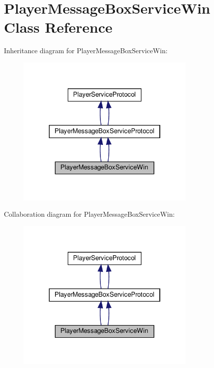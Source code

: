 \hypertarget{classPlayerMessageBoxServiceWin}{}\section{Player\+Message\+Box\+Service\+Win Class Reference}
\label{classPlayerMessageBoxServiceWin}


Inheritance diagram for Player\+Message\+Box\+Service\+Win\+:
\nopagebreak
\begin{figure}[H]
\begin{center}
\leavevmode
\includegraphics[width=250pt]{classPlayerMessageBoxServiceWin__inherit__graph}
\end{center}
\end{figure}


Collaboration diagram for Player\+Message\+Box\+Service\+Win\+:
\nopagebreak
\begin{figure}[H]
\begin{center}
\leavevmode
\includegraphics[width=250pt]{classPlayerMessageBoxServiceWin__coll__graph}
\end{center}
\end{figure}
